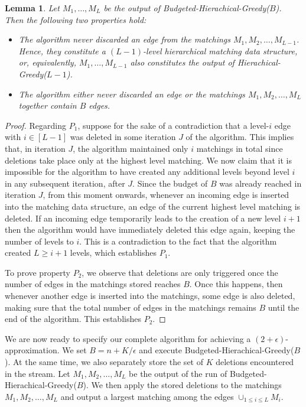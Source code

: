 \documentclass[11pt,a4paper]{article}
\newtheorem{lemma}{Lemma}
\begin{document}
\begin{lemma} 
\label{lem:prefixHM}
Let $M_1, \dots, M_L$ be the output of \textsf{Budgeted-Hierachical-Greedy($B$)}. Then the following two properties hold:

\begin{itemize}
\item[($P_1$)]
The algorithm never discarded an edge from the matchings $M_1, M_2, \dots, M_{L-1}$. Hence, they constitute a $(L - 1)$-level hierarchical matching data structure, or, equivalently, $M_1, \dots, M_{L-1}$ also constitutes the output of \textsf{Hierachical-Greedy}($L-1$).

\item[($P_2$)]
The algorithm either never discarded an edge or the matchings $M_1, M_2, \dots, M_{L}$ together contain $B$ edges.
\end{itemize}
\end{lemma}

\begin{proof}
Regarding $P_1$, suppose for the sake of a contradiction that a level-$i$ edge with $i \in [L-1]$ was deleted in some iteration $J$ of the algorithm. This implies that, in iteration $J$, the algorithm maintained only $i$ matchings in total since deletions take place only at the highest level matching. We now claim that it is impossible for the algorithm to have created any additional levels beyond level $i$ in any subsequent iteration, after $J$. Since the budget of $B$ was already reached in iteration $J$, from this moment onwards, whenever an incoming edge is inserted into the matching data structure, an edge of the current highest level matching is deleted. If an incoming edge temporarily leads to the creation of a new level $i+1$ then the algorithm would have immediately deleted this edge again, keeping the number of levels to $i$. This is a contradiction to the fact that the algorithm created $L \ge i+1$ levels, which establishes $P_1$.

To prove property $P_2$, we observe that deletions are only triggered once the number of edges in the matchings stored reaches $B$. Once this happens, then whenever another edge is inserted into the matchings, some edge is also deleted, making sure that the total number of edges in the matchings remains $B$ until the end of the algorithm. This establishes $P_2$.
\end{proof}

We are now ready to specify our complete algorithm for achieving a $(2+\epsilon)$-approximation. We set $B = n+K/\epsilon$ and execute \textsf{Budgeted-Hierachical-Greedy}($B$). At the same time, we also separately store the set of $K$ deletions encountered in the stream. Let $M_1, M_2, \dots, M_{L}$ be the output of the run of \textsf{Budgeted-Hierachical-Greedy}($B$). We then apply the stored deletions to the matchings $M_1, M_2, \dots, M_{L}$ and output a largest matching among the edges $\cup_{1 \le i \le L} M_i$.
\end{document}
